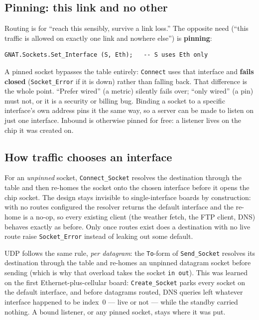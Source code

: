 \subsection{Pinning: this link and no other}

Routing is for ``reach this sensibly, survive a link loss.'' The opposite need
(``this traffic is allowed on exactly one link and nowhere else'') is
\textbf{pinning}:

\begin{lstlisting}
GNAT.Sockets.Set_Interface (S, Eth);   -- S uses Eth only
\end{lstlisting}

A pinned socket bypasses the table entirely: \texttt{Connect} uses that interface and
\textbf{fails closed} (\texttt{Socket\_Error} if it is down) rather than falling
back. That difference is the whole point. ``Prefer wired'' (a metric) silently fails
over; ``only wired'' (a pin) must not, or it is a security or billing bug. Binding a
socket to a specific interface's own address pins it the same way, so a server can be
made to listen on just one interface. Inbound is otherwise pinned for free: a
listener lives on the chip it was created on.

\subsection{How traffic chooses an interface}

For an \emph{unpinned} socket, \texttt{Connect\_Socket} resolves the destination
through the table and then re-homes the socket onto the chosen interface before it
opens the chip socket. The design stays invisible to single-interface boards by
construction: with no routes configured the resolver returns the default interface
and the re-home is a no-op, so every existing client (the weather fetch, the FTP
client, DNS) behaves exactly as before. Only once routes exist does a destination
with no live route raise \texttt{Socket\_Error} instead of leaking out some default.

UDP follows the same rule, \emph{per datagram}: the \texttt{To}-form of
\texttt{Send\_Socket} resolves its destination through the table and re-homes an
unpinned datagram socket before sending (which is why that overload takes the
socket \texttt{in out}). This was learned on the first Ethernet-plus-cellular
board: \texttt{Create\_Socket} parks every socket on the default interface, and
before datagrams routed, DNS queries left whatever interface happened to be
index~0 --- live or not --- while the standby carried nothing. A bound listener,
or any pinned socket, stays where it was put.

